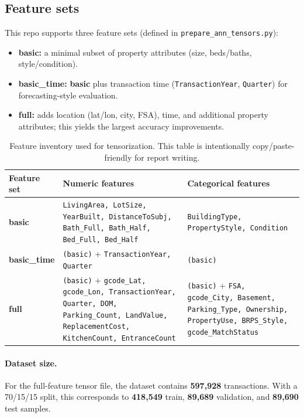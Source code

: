 \documentclass[11pt]{article}
\newcommand{\NTotal}{597{,}928}
\newcommand{\NTrain}{418{,}549}
\newcommand{\NVal}{89{,}689}
\newcommand{\NTest}{89{,}690}
\begin{document}
\subsection{Feature sets}
This repo supports three feature sets (defined in \texttt{prepare\_ann\_tensors.py}):
\begin{itemize}[leftmargin=*]
  \item \textbf{basic:} a minimal subset of property attributes (size, beds/baths, style/condition).
  \item \textbf{basic\_time:} \textbf{basic} plus transaction time (\texttt{TransactionYear}, \texttt{Quarter}) for forecasting-style evaluation.
  \item \textbf{full:} adds location (lat/lon, city, FSA), time, and additional property attributes; this yields the largest accuracy improvements.
\end{itemize}

\begin{table}[h]
\centering
\small
\begin{tabularx}{\linewidth}{@{}l>{\raggedright\arraybackslash}X>{\raggedright\arraybackslash}X@{}}
\toprule
Feature set & Numeric features & Categorical features \\
\midrule
\textbf{basic} &
\texttt{LivingArea, LotSize, YearBuilt, DistanceToSubj, Bath\_Full, Bath\_Half, Bed\_Full, Bed\_Half} &
\texttt{BuildingType, PropertyStyle, Condition} \\
\addlinespace
\textbf{basic\_time} &
\texttt{(basic)} + \texttt{TransactionYear, Quarter} &
\texttt{(basic)} \\
\addlinespace
\textbf{full} &
\texttt{(basic)} + \texttt{gcode\_Lat, gcode\_Lon, TransactionYear, Quarter, DOM, Parking\_Count, LandValue, ReplacementCost, KitchenCount, EntranceCount} &
\texttt{(basic)} + \texttt{FSA, gcode\_City, Basement, Parking\_Type, Ownership, PropertyUse, BRPS\_Style, gcode\_MatchStatus} \\
\bottomrule
\end{tabularx}
\caption{Feature inventory used for tensorization. This table is intentionally copy/paste-friendly for report writing.}
\label{tab:feature-inventory}
\end{table}

\paragraph{Dataset size.}
For the full-feature tensor file, the dataset contains \textbf{\NTotal} transactions. With a 70/15/15 split, this corresponds to \textbf{\NTrain} train, \textbf{\NVal} validation, and \textbf{\NTest} test samples.
\end{document}
